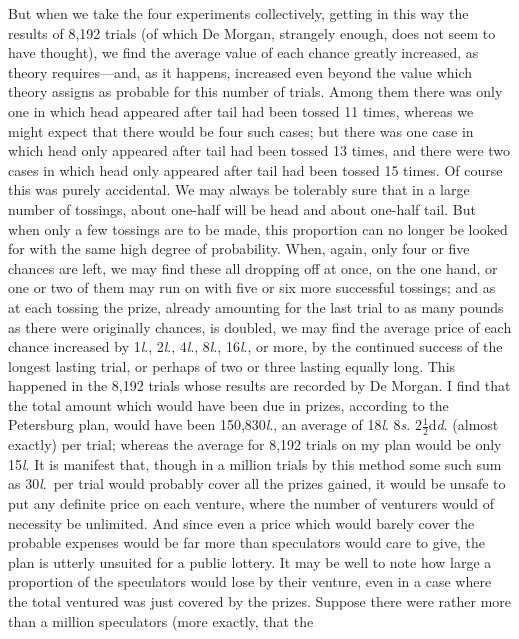 \documentclass[letterpaper,12pt,oneside,openany]{memoir}
\begin{document}
But when we take the four experiments collectively,
getting in this way the results of 8,192 trials (of which
De Morgan, strangely enough, does not seem to have
thought), we find the average value of each chance
greatly increased, as theory requires---and, as it happens,
increased even beyond the value which theory assigns
as probable for this number of trials. Among them
there was only one in which head appeared after tail
had been tossed 11 times, whereas we might expect that
there would be four such cases; but there was one case
in which head only appeared after tail had been tossed
13 times, and there were two cases in which head only
appeared after tail had been tossed 15 times. Of course
this was purely accidental. We may always be tolerably
sure that in a large number of tossings, about one-half
will be head and about one-half tail. But when
only a few tossings are to be made, this proportion can
no longer be looked for with the same high degree of
probability. When, again, only four or five chances
are left, we may find these all dropping off at once, on
the one hand, or one or two of them may run on with
five or six more successful tossings; and as at each
tossing the prize, already amounting for the last trial
to as many pounds as there were originally chances, is
doubled, we may find the average price of each chance
increased by 1\textit{l}., 2\textit{l}., 4\textit{l}., 8\textit{l}., 16\textit{l}., or more, by the continued
success of the longest lasting trial, or perhaps of
two or three lasting equally long. This happened in
the 8,192 trials whose results are recorded by De
Morgan. I find that the total amount which would
have been due in prizes, according to the Petersburg
plan, would have been 150,830\textit{l}., an average of
18\textit{l}. 8\textit{s}. $2\frac{1}{2}$d\textit{d}. (almost
exactly) per trial; whereas the average for
8,192 trials on my plan would be only 15\textit{l}.
It is manifest that, though in a million trials by
this method some such sum as 30\textit{l}.\ per trial would probably
cover all the prizes gained, it would be unsafe to
put any definite price on each venture, where the
number of venturers would of necessity be unlimited.
And since even a price which would barely cover the
probable expenses would be far more than speculators
would care to give, the plan is utterly unsuited for a
public lottery. It may be well to note how large a
proportion of the speculators would lose by their venture,
even in a case where the total ventured was just
covered by the prizes. Suppose there were rather
more than a million speculators (more exactly, that the
\end{document}
